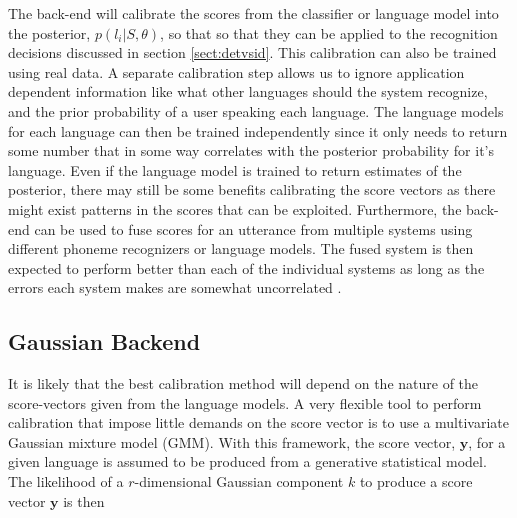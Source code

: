 The back-end will calibrate the scores from the classifier or language model into the posterior, $p(l_i | S, \theta)$, so that so that they can be applied to the recognition decisions discussed in section \ref{sect:detvsid}. This calibration can also be trained using real data. A separate calibration step allows us to ignore application dependent information like what other languages should the system recognize, and the prior probability of a user speaking each language. The language models for each language can then be trained independently since it only needs to return some number that in some way correlates with the posterior probability for it's language. Even if the language model is trained to return estimates of the posterior, there may still be some benefits calibrating the score vectors \cite[820]{lidbok} as there might exist patterns in the scores that can be exploited. Furthermore, the back-end can be used to fuse scores for an utterance from multiple systems using different phoneme recognizers or language models. The fused system is then expected to perform better than each of the individual systems as long as the errors each system makes are somewhat uncorrelated \cite[818]{lidbok}.

\subsection{Gaussian Backend}
\label{sect:gmmscore}

It is likely that the best calibration method will depend on the nature of the score-vectors given from the language models. A very flexible tool to perform calibration that impose little demands on the score vector is to use a multivariate Gaussian mixture model (GMM). With this framework, the score vector, $\mathbf{y}$, for a given language is assumed to be produced from a generative statistical model. The likelihood of a $r$-dimensional Gaussian component $k$ to produce a score vector $\mathbf{y}$ is then

